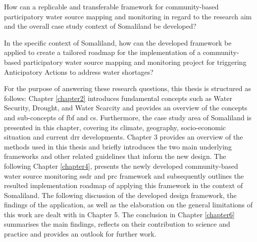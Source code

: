 \begin{questions}
    \item How can a replicable and transferable framework for community-based participatory water source mapping and monitoring in regard to the research aim and the overall case study context of Somaliland be developed?
    \item In the specific context of Somaliland, how can the developed framework be applied to create a tailored roadmap for the implementation of a community-based participatory water source mapping and monitoring project for triggering Anticipatory Actions to address water shortages?
\end{questions}

\noindent For the purpose of answering these research questions, this thesis is structured as follows: Chapter \ref{chapter2} introduces fundamental concepts such as Water Security, Drought, and Water Scarcity and provides an overview of the concepts and sub-concepts of \acrshort{fbf} and \acrshort{cs}. Furthermore, the case study area of Somaliland is presented in this chapter, covering its climate, geography, socio-economic situation and current \acrlong{drr} developments. Chapter 3 provides an overview of the methods used in this thesis and briefly introduces the two main underlying frameworks and other related guidelines that inform the new design. The following Chapter \ref{chapter4}, presents the newly developed community-based water source monitoring \acrfull{ssdr} and \acrfull{prc} framework and subsequently outlines the resulted implementation roadmap of applying this framework in the context of Somaliland. The following discussion of the developed design framework, the findings of the application, as well as the elaboration on the general limitations of this work are dealt with in Chapter 5. The conclusion in Chapter \ref{chapter6} summarises the main findings, reflects on their contribution to science and practice and provides an outlook for further work.
